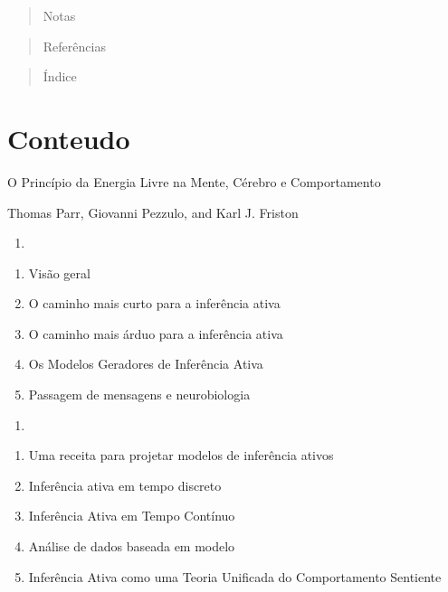 \documentclass[
]{book}
\providecommand{\tightlist}{%
  \setlength{\itemsep}{0pt}\setlength{\parskip}{0pt}}
\begin{document}
\begin{quote}
Notas
\end{quote}

\begin{quote}
Referências
\end{quote}

\begin{quote}
Índice
\end{quote}

\hypertarget{conteudo}{%
\chapter*{Conteudo}\label{conteudo}}

O Princípio da Energia Livre na Mente, Cérebro e Comportamento

Thomas Parr, Giovanni Pezzulo, and Karl J. Friston

\begin{enumerate}
\def\labelenumi{(\Roman{enumi})}
\tightlist
\item
\end{enumerate}

\begin{enumerate}
\def\labelenumi{\arabic{enumi}.}
\tightlist
\item
  Visão geral\\
\item
  O caminho mais curto para a inferência ativa\\
\item
  O caminho mais árduo para a inferência ativa\\
\item
  Os Modelos Geradores de Inferência Ativa\\
\item
  Passagem de mensagens e neurobiologia
\end{enumerate}

\begin{enumerate}
\def\labelenumi{(\Roman{enumi})}
\setcounter{enumi}{1}
\tightlist
\item
\end{enumerate}

\begin{enumerate}
\def\labelenumi{\arabic{enumi}.}
\setcounter{enumi}{5}
\tightlist
\item
  Uma receita para projetar modelos de inferência ativos
\item
  Inferência ativa em tempo discreto
\item
  Inferência Ativa em Tempo Contínuo
\item
  Análise de dados baseada em modelo
\item
  Inferência Ativa como uma Teoria Unificada do Comportamento Sentiente
\end{enumerate}
\end{document}
